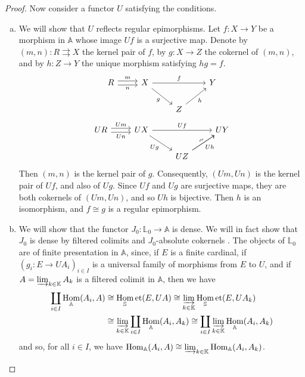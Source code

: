 \documentclass{article}
\newcommand{\bb}[1]{{\mathbb{#1}}}
\newcommand{\Set}{\mathbb{S}\mathrm{et}}
\DeclareMathOperator{\Hom}{Hom}
\newcommand{\oldpage}[1]{\marginpar{\footnotesize$\Big\vert$ \textit{p.~#1}}}
\begin{document}
\begin{proof}
  Now consider a functor $U$ satisfying the conditions.
  \begin{enumerate}[a)]
    \item We will show that $U$ reflects regular epimorphisms.
      Let $f\colon X\to Y$ be a morphism in $\bb{A}$ whose image $Uf$ is a surjective map.
      Denote by $(m,n)\colon R\rightrightarrows X$ the kernel pair of $f$, by $g\colon X\to Z$ the cokernel of $(m,n)$, and by $h\colon Z\to Y$ the unique morphism satisfying $hg=f$.
      \[
        \begin{tikzcd}
          R \rar[shift left,"m"] \rar[shift right,swap,"n"]
          & X \ar[rr,"f"] \ar[dr,swap,"g"]
          && Y
        \\&& Z \ar[ur,swap,"h"]
        \end{tikzcd}
      \]
      \[
        \begin{tikzcd}
          UR \rar[shift left,"Um"] \rar[shift right,swap,"Un"]
          & UX \ar[rr,"Uf"] \ar[dr,swap,"Ug"]
          && UY
        \\&& UZ \ar[ur,swap,"Uh"] \ar[ur,sloped,"\sim"]
        \end{tikzcd}
      \]
      Then $(m,n)$ is the kernel pair of $g$.
      Consequently, $(Um,Un)$ is the kernel pair of $Uf$, and also of $Ug$.
      Since $Uf$ and $Ug$ are surjective maps, they are both cokernels of $(Um,Un)$, and so $Uh$ is bijective.
      Then $h$ is an isomorphism, and $f\cong g$ is a regular epimorphism.
\oldpage{202}
    \item We will show that the functor $J_0\colon\bb{L}_0\to\bb{A}$ is dense.
      We will in fact show that $J_0$ is dense by filtered colimits and $J_0$-absolute cokernels \cite{4}.
      The objects of $\bb{L}_0$ are of finite presentation in $\bb{A}$, since, if $E$ is a finite cardinal, if $(g_i\colon E\to UA_i)_{i\in I}$ is a universal family of morphisms from $E$ to $U$, and if $A=\varinjlim_{k\in\bb{K}}A_k$ is a filtered colimit in $\bb{A}$, then we have
      \[
        \begin{aligned}
          \coprod_{i\in I} \Hom_\bb{A}(A_i,A)
          &\cong \Hom_\Set(E,UA)
          \cong \varinjlim_{k\in\bb{K}} \Hom_\Set(E,UA_k)
        \\&\cong \varinjlim_{k\in\bb{K}} \coprod_{i\in I} \Hom_\bb{A}(A_i,A_k)
          \cong \coprod_{i\in I} \varinjlim_{k\in\bb{K}} \Hom_\bb{A}(A_i,A_k)
        \end{aligned}
      \]
      and so, for all $i\in I$, we have $\Hom_\bb{A}(A_i,A)\cong\varinjlim_{k\in\bb{K}}\Hom_\bb{A}(A_i,A_k)$.

\end{enumerate}
\end{proof}
\end{document}
